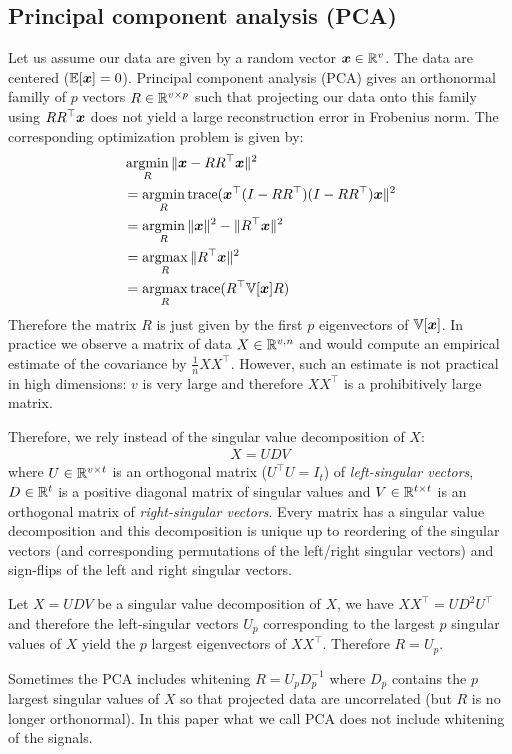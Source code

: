 \subsection{Principal component analysis (PCA)}
Let us assume our data are given by a random vector $\boldsymbol{x} \in \mathbb{R}^{v}$. The data
are centered ($\mathbb{E}[\boldsymbol{x}] = 0$). Principal component analysis (PCA) gives an orthonormal familly of $p$ vectors $R \in \mathbb{R}^{v \times p}$ such that projecting our data onto this family
using $R R^{\top} \boldsymbol{x}$ does not yield a large reconstruction error in Frobenius
norm.
The corresponding optimization problem is given by:
\begin{align}
  &\operatorname*{argmin}_{R} \|\boldsymbol{x} - R R^{\top} \boldsymbol{x} \|^2 \\
  &=\operatorname*{argmin}_{R} {\mathrm{ trace}}(  \boldsymbol{x}^{\top}(I - R R^{\top}) (I - R R^{\top}) \boldsymbol{x}\|^2 \\
  &= \operatorname*{argmin}_{R} \|\boldsymbol{x} \|^2 - \|R^{\top} \boldsymbol{x} \|^2 \\
  &= \operatorname*{argmax}_{R} \|R^{\top} \boldsymbol{x} \|^2 \\
  &= \operatorname*{argmax}_{R} {\mathrm{ trace}}(R^{\top} \mathbb{V}[\boldsymbol{x}] R)
\end{align}
Therefore the matrix $R$ is just given by the first $p$ eigenvectors of
$\mathbb{V}[\boldsymbol{x}]$. In practice we observe a matrix of data $X \in \mathbb{R}^{v, n}$ and
would compute an empirical estimate of the covariance by $\frac1{n}X X^{\top}$.
%
However, such an estimate is not practical in high dimensions: $v$ is very
large and therefore $XX^{\top}$ is a prohibitively large matrix.

Therefore, we rely instead of the singular value decomposition of $X$:
\begin{align}
X= U D V
\end{align}
  where $U \in \mathbb{R}^{v \times t}$ is an orthogonal matrix ($U^{\top} U
= I_t$) of
\emph{left-singular vectors}, $D \in \mathbb{R}^{t}$ is a positive diagonal matrix of
singular values and $V \in \mathbb{R}^{t \times t}$ is an orthogonal matrix of
\emph{right-singular vectors}.
%
Every matrix has a singular value decomposition and this
decomposition is unique up to reordering of the singular vectors (and
corresponding permutations of the left/right singular vectors) and sign-flips of
the left and right singular vectors.

Let $X = UDV$ be a singular value decomposition of $X$, we have $XX^{\top}= U
D^2 U^{\top}$ and therefore the left-singular vectors $U_p$ corresponding to the
largest $p$ singular values of $X$ yield  the $p$ largest eigenvectors of
$XX^{\top}$.
Therefore $R = U_p$.

Sometimes the PCA includes whitening $R = U_p D_p^{-1}$ where $D_p$ contains the
 $p$ largest singular values of $X$ so that projected data are
uncorrelated (but $R$ is no longer orthonormal). In this paper what we call PCA
does not include whitening of the signals.

